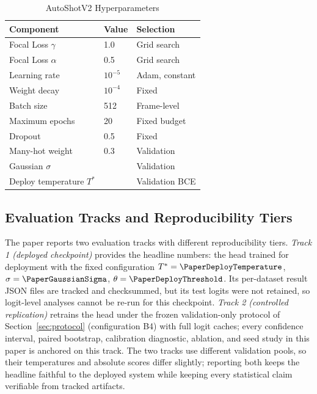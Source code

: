 \begin{table}[!t]
\caption{AutoShotV2 Hyperparameters}
\label{tab:hyperparams}
\centering
\small
\renewcommand{\arraystretch}{1.08}
\begin{tabular}{L{1.25in}C{0.7in}L{0.85in}}
\toprule
\textbf{Component} & \textbf{Value} & \textbf{Selection} \\
\midrule
Focal Loss $\gamma$ & 1.0 & Grid search \\
Focal Loss $\alpha$ & 0.5 & Grid search \\
Learning rate & $10^{-5}$ & Adam, constant \\
Weight decay & $10^{-4}$ & Fixed \\
Batch size & 512 & Frame-level \\
Maximum epochs & 20 & Fixed budget \\
Dropout & 0.5 & Fixed \\
Many-hot weight & 0.3 & Validation \\
Gaussian $\sigma$ & \PaperGaussianSigma{} & Validation \\
Deploy temperature $T^{*}$ & \PaperDeployTemperature{} & Validation BCE \\
\bottomrule
\end{tabular}
\end{table}

\subsection{Evaluation Tracks and Reproducibility Tiers}
\label{sec:tracks}

The paper reports two evaluation tracks with different reproducibility
tiers. \emph{Track 1 (deployed checkpoint)} provides the headline numbers:
the head trained for deployment with the fixed configuration
$T^{*}=\PaperDeployTemperature$, $\sigma=\PaperGaussianSigma$,
$\theta=\PaperDeployThreshold$. Its per-dataset result JSON files are
tracked and checksummed, but its test logits were not retained, so
logit-level analyses cannot be re-run for this checkpoint. \emph{Track 2
(controlled replication)} retrains the head under the frozen validation-only
protocol of Section~\ref{sec:protocol} (configuration B4) with full logit
caches; every confidence interval, paired bootstrap, calibration diagnostic,
ablation, and seed study in this paper is anchored on this track. The two
tracks use different validation pools, so their temperatures and absolute
scores differ slightly; reporting both keeps the headline faithful to the
deployed system while keeping every statistical claim verifiable from
tracked artifacts.

